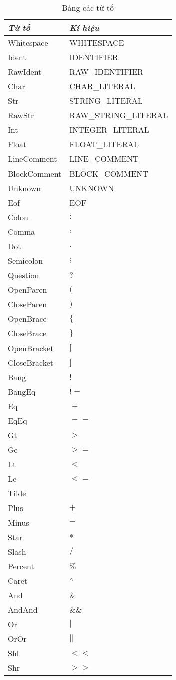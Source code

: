 \begin{longtable}{|p{4cm}| l |}
    \caption{Bảng các từ tố} \\
\hline
\textbf{\textit{Từ tố}} & \textbf{\textit{Kí hiệu}} \\
\hline
Whitespace & WHITESPACE \\
\hline
Ident & IDENTIFIER \\
\hline
RawIdent & RAW\_IDENTIFIER \\
\hline
Char & CHAR\_LITERAL \\
\hline
Str & STRING\_LITERAL \\
\hline
RawStr & RAW\_STRING\_LITERAL \\
\hline
Int & INTEGER\_LITERAL \\
\hline
Float & FLOAT\_LITERAL \\
\hline
LineComment & LINE\_COMMENT \\
\hline
BlockComment & BLOCK\_COMMENT \\
\hline
Unknown & UNKNOWN \\
\hline
Eof & EOF \\
\hline
Colon & $:$ \\
\hline
Comma & $,$ \\
\hline
Dot & $.$ \\
\hline
Semicolon & $;$ \\
\hline
Question & $?$ \\
\hline
OpenParen & $($ \\
\hline
CloseParen & $)$ \\
\hline
OpenBrace & $\{$ \\
\hline
CloseBrace & $\}$ \\
\hline
OpenBracket & $[$ \\
\hline
CloseBracket & $]$ \\
\hline
Bang & $!$ \\
\hline
BangEq & $!=$ \\
\hline
Eq & $=$ \\
\hline
EqEq & $==$ \\
\hline
Gt & $>$ \\
\hline
Ge & $>=$ \\
\hline
Lt & $<$ \\
\hline
Le & $<=$ \\
\hline
Tilde & $~$ \\
\hline
Plus & $+$ \\
\hline
Minus & $-$ \\
\hline
Star & $*$ \\
\hline
Slash & $/$ \\
\hline
Percent & $\%$ \\
\hline
Caret & $\textsuperscript{$\wedge$}$ \\
\hline
And & $\&$ \\
\hline
AndAnd & $\&\&$ \\
\hline
Or & $|$ \\
\hline
OrOr & $||$ \\
\hline
Shl & $<<$ \\
\hline
Shr & $>>$ \\
\hline
\end{longtable}
